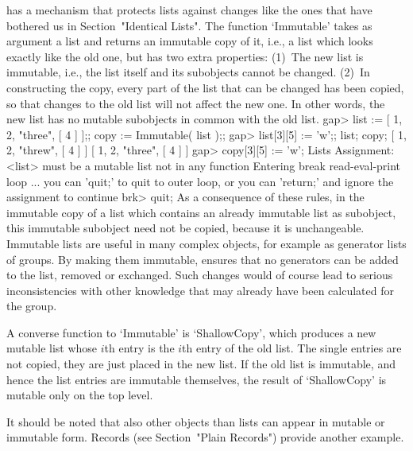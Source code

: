 {\GAP} has a mechanism that protects lists against  changes like the ones
that have bothered   us in    Section~"Identical Lists". The     function
`Immutable' takes as argument a list and returns an immutable copy of it,
i.e., a list  which  looks exactly like the   old one, but has  two extra
properties:
(1)~The new list is immutable, i.e.,  the list itself and its subobjects 
    cannot be changed.
(2)~In constructing the copy, every part of  the list that can be changed
    has been copied, so that changes to the  old list will not affect the
    new one.  In other words, the new  list has no  mutable subobjects in
    common with the old list.
\beginexample
gap> list := [ 1, 2, "three", [ 4 ] ];; copy := Immutable( list );;
gap> list[3][5] := 'w';; list; copy;
[ 1, 2, "threw", [ 4 ] ]
[ 1, 2, "three", [ 4 ] ]
gap> copy[3][5] := 'w';
Lists Assignment: <list> must be a mutable list
not in any function
Entering break read-eval-print loop ...
you can 'quit;' to quit to outer loop, or
you can 'return;' and ignore the assignment to continue
brk> quit;
\endexample
As a consequence of  these rules, in the  immutable copy of a list  which
contains an already immutable list as subobject, this immutable subobject
need not be copied,  because it is unchangeable. Immutable lists are
useful in many complex {\GAP} objects,  for example as generator lists of
groups. By  making them immutable, {\GAP}  ensures that no generators can
be added to the list, removed or exchanged. Such  changes would of course
lead  to serious inconsistencies with  other  knowledge that may already
have been calculated for the group.

A converse function to `Immutable' is `ShallowCopy', which produces a
new mutable list whose $i$th entry is the $i$th entry of the old
list. The single entries are not copied, they are just placed in the
new list.  If the old list is immutable, and hence the list entries
are immutable themselves, the result of `ShallowCopy' is mutable only
on the top level.

It should be noted that also other objects than lists can appear in
mutable or immutable form.
Records (see Section~"Plain Records") provide another example.

%

